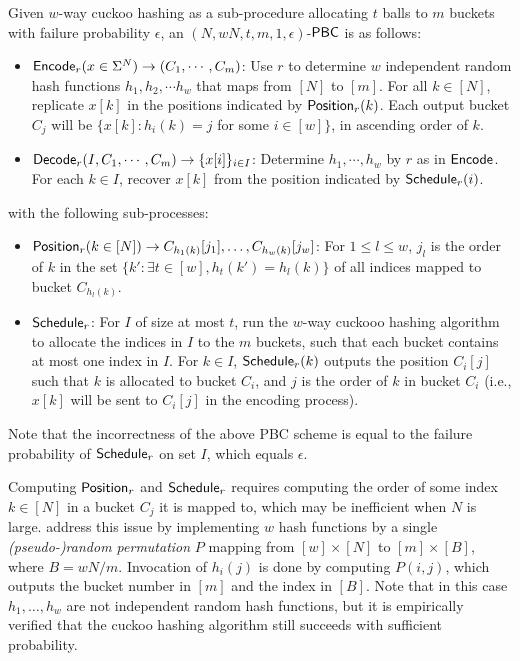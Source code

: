 \begin{construction}\label{con:PBC_from_cuckoo}
  Given $w$-way cuckoo hashing as a sub-procedure allocating $t$ balls to $m$ buckets with failure probability $\epsilon$, an $(N,wN,t,m,1,\epsilon)$-${\sf PBC}$ is as follows: 
  \begin{itemize}
    \item ${\sf Encode}_r(x\in\Sigma^N)\rightarrow (C_1,\cdots,C_m)$: Use $r$ to determine $w$ independent random hash functions $h_1,h_2,\cdots h_w$ that maps from $[N]$ to $[m]$. For all $k\in[N]$, replicate $x[k]$ in the positions indicated by ${\sf Position}_r(k)$. Each output bucket $C_j$ will be $\{x[k]:h_i(k) = j$ for some $i\in [w]\}$, in ascending order of $k$. 
    \item ${\sf Decode}_r(I, C_1,\cdots, C_m)\rightarrow \{x[i]\}_{i\in I}$: Determine $h_1,\cdots, h_w$ by $r$ as in ${\sf Encode}$. For each $k\in I$, recover $x[k]$ from the position indicated by ${\sf Schedule}_r(i)$. 
  \end{itemize}
  with the following sub-processes: 
  \begin{itemize}
    \item ${\sf Position}_r(k\in[N])\rightarrow C_{h_1(k)}[j_1],\dots,C_{h_w(k)}[j_w]$: For $1\le l\le w$, $j_l$ is the order of $k$ in the set $\{k':\exists t\in[w], h_t(k') = h_l(k)\}$ of all indices mapped to bucket $C_{h_l(k)}$. 
    \item ${\sf Schedule}_r$: For $I$ of size at most $t$, run the $w$-way cuckooo hashing algorithm to allocate the indices in $I$ to the $m$ buckets, such that each bucket contains at most one index in $I$. For $k\in I$, ${\sf Schedule}_r(k)$ outputs the position $C_i[j]$ such that $k$ is allocated to bucket $C_i$, and $j$ is the order of $k$ in bucket $C_i$ (i.e., $x[k]$ will be sent to $C_i[j]$ in the encoding process). 
  \end{itemize}
\end{construction}
Note that the incorrectness of the above PBC scheme is equal to the failure probability of ${\sf Schedule}_r$ on set $I$, which equals $\epsilon$. 

Computing ${\sf Position}_r$ and ${\sf Schedule}_r$ requires computing the order of some index $k\in[N]$ in a bucket $C_j$ it is mapped to, which may be inefficient when $N$ is large. \cite{cryptoeprint:2021/580} address this issue by implementing $w$ hash functions by a single \emph{(pseudo-)random permutation} $P$ mapping from $[w]\times [N]$ to $[m]\times [B]$, where $B = wN/m$. Invocation of $h_i(j)$ is done by computing $P(i,j)$, which outputs the bucket number in $[m]$ and the index in $[B]$. Note that in this case $h_1,\dots,h_w$ are not independent random hash functions, but it is empirically verified that the cuckoo hashing algorithm still succeeds with sufficient probability. 

